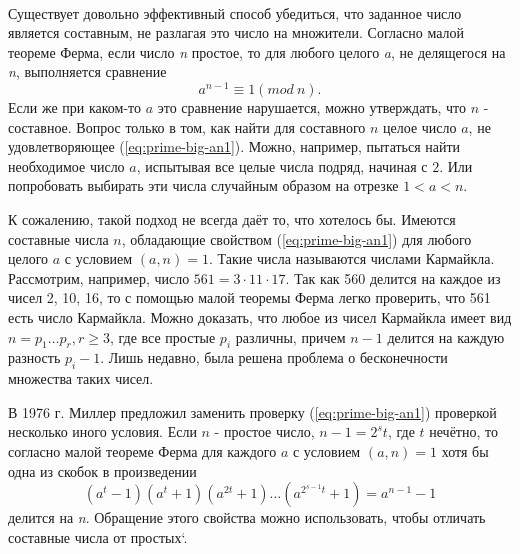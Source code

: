 
\paragraph{} Существует довольно эффективный способ убедиться, что заданное число является составным, не разлагая это число на множители. 
Согласно малой теореме Ферма, если число \textit{n} простое, то для любого целого \textit{a}, не делящегося на \textit{n}, выполняется сравнение
\begin{equation} \label{eq:prime-big-an1}
 a^{ n-1} \equiv 1 (mod \: n).
\end{equation}
Если же при каком-то {$a$} это сравнение нарушается, можно утверждать, что {$n$} - составное. Вопрос только в том, как найти для составного {$n$}
целое число {$a$}, не удовлетворяющее (\ref{eq:prime-big-an1}). Можно, например, пытаться найти необходимое число {$a$}, испытывая все целые числа подряд, 
начиная с {$2$}. Или попробовать выбирать эти числа случайным образом на отрезке {$1 < a < n$}.

  К сожалению, такой подход не всегда даёт то, что хотелось бы. Имеются составные числа {$n$}, обладающие свойством (\ref{eq:prime-big-an1}) для любого целого
{$a$} с условием {$(a, n) = 1$}. Такие числа называются числами Кармайкла. Рассмотрим, например, число {$561 = 3 \cdot 11 \cdot 17$}. 
Так как 560 делится на каждое из чисел 2, 10, 16, то с помощью малой теоремы Ферма легко проверить, что 561 есть число Кармайкла. 
Можно доказать, что любое из чисел Кармайкла имеет вид {$n = p_{1} \dots p_{r}, r \geq 3$}, 
где все простые {$p_{i}$} различны, причем {$n - 1$} делится на каждую разность {$p_{i} - 1$}. 
Лишь недавно, была решена проблема о бесконечности множества таких чисел.

  В 1976 г. Миллер предложил заменить проверку (\ref{eq:prime-big-an1}) проверкой несколько иного условия. Если {$n$} - простое число, 
{$n - 1 = 2^{ s} t$}, где {$t$} нечётно, то согласно малой теореме Ферма для каждого {$a$} с 
условием {$(a, n) = 1$} хотя бы одна из скобок в произведении
\begin{equation} \label{eq:prime-big-at1}
 (a^{ t} - 1)(a^{ t} + 1)(a^{ 2 t} + 1) \dots (a^{ 2^{ s - 1}t} + 1) = a^{ n - 1} - 1
\end{equation}
делится на \textit{n}. Обращение этого свойства можно использовать, чтобы отличать составные числа от простых`.

